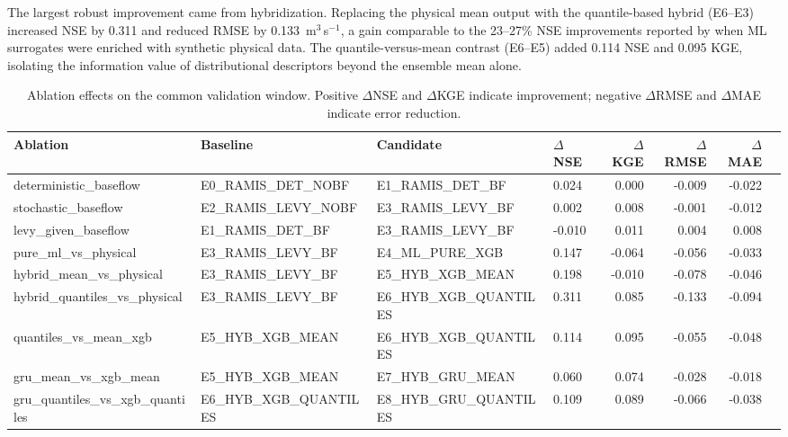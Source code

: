 \documentclass[a4paper,fleqn]{cas-sc}
\begin{document}
The largest robust improvement came from hybridization. Replacing the
physical mean output with the quantile-based hybrid (E6--E3) increased
NSE by 0.311 and reduced RMSE by 0.133~m$^3$\,s$^{-1}$, a gain
comparable to the 23--27\% NSE improvements reported by
\citet{yang2020} when ML surrogates were enriched with synthetic
physical data. The quantile-versus-mean contrast (E6--E5) added 0.114
NSE and 0.095 KGE, isolating the information value of distributional
descriptors beyond the ensemble mean alone.

\begin{table}[t]
\caption{Ablation effects on the common validation window. Positive
$\Delta$NSE and $\Delta$KGE indicate improvement; negative
$\Delta$RMSE and $\Delta$MAE indicate error reduction.}
\label{tab:ablation}
\centering
\small
\begin{tabular*}{\textwidth}{@{\extracolsep{\fill}}llllrrrr@{}}
\toprule
Ablation & Baseline & Candidate
  & $\Delta$NSE & $\Delta$KGE & $\Delta$RMSE & $\Delta$MAE \\
\midrule
deterministic\_baseflow
  & E0\_RAMIS\_DET\_NOBF & E1\_RAMIS\_DET\_BF
  & 0.024 & 0.000 & -0.009 & -0.022 \\
stochastic\_baseflow
  & E2\_RAMIS\_LEVY\_NOBF & E3\_RAMIS\_LEVY\_BF
  & 0.002 & 0.008 & -0.001 & -0.012 \\
levy\_given\_baseflow
  & E1\_RAMIS\_DET\_BF & E3\_RAMIS\_LEVY\_BF
  & -0.010 & 0.011 & 0.004 & 0.008 \\
pure\_ml\_vs\_physical
  & E3\_RAMIS\_LEVY\_BF & E4\_ML\_PURE\_XGB
  & 0.147 & -0.064 & -0.056 & -0.033 \\
hybrid\_mean\_vs\_physical
  & E3\_RAMIS\_LEVY\_BF & E5\_HYB\_XGB\_MEAN
  & 0.198 & -0.010 & -0.078 & -0.046 \\
hybrid\_quantiles\_vs\_physical
  & E3\_RAMIS\_LEVY\_BF & E6\_HYB\_XGB\_QUANTILES
  & 0.311 & 0.085 & -0.133 & -0.094 \\
quantiles\_vs\_mean\_xgb
  & E5\_HYB\_XGB\_MEAN & E6\_HYB\_XGB\_QUANTILES
  & 0.114 & 0.095 & -0.055 & -0.048 \\
gru\_mean\_vs\_xgb\_mean
  & E5\_HYB\_XGB\_MEAN & E7\_HYB\_GRU\_MEAN
  & 0.060 & 0.074 & -0.028 & -0.018 \\
gru\_quantiles\_vs\_xgb\_quantiles
  & E6\_HYB\_XGB\_QUANTILES & E8\_HYB\_GRU\_QUANTILES
  & 0.109 & 0.089 & -0.066 & -0.038 \\
\bottomrule
\end{tabular*}
\end{table}
\end{document}
